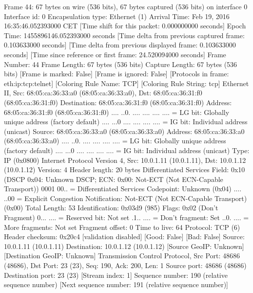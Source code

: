 Frame 44: 67 bytes on wire (536 bits), 67 bytes captured (536 bits) on interface 0
    Interface id: 0
    Encapsulation type: Ethernet (1)
    Arrival Time: Feb 19, 2016 16:35:46.052393000 CET
    [Time shift for this packet: 0.000000000 seconds]
    Epoch Time: 1455896146.052393000 seconds
    [Time delta from previous captured frame: 0.103633000 seconds]
    [Time delta from previous displayed frame: 0.103633000 seconds]
    [Time since reference or first frame: 24.520094000 seconds]
    Frame Number: 44
    Frame Length: 67 bytes (536 bits)
    Capture Length: 67 bytes (536 bits)
    [Frame is marked: False]
    [Frame is ignored: False]
    [Protocols in frame: eth:ip:tcp:telnet]
    [Coloring Rule Name: TCP]
    [Coloring Rule String: tcp]
Ethernet II, Src: 68:05:ca:36:33:a0 (68:05:ca:36:33:a0), Dst: 68:05:ca:36:31:f0 (68:05:ca:36:31:f0)
    Destination: 68:05:ca:36:31:f0 (68:05:ca:36:31:f0)
        Address: 68:05:ca:36:31:f0 (68:05:ca:36:31:f0)
        .... ..0. .... .... .... .... = LG bit: Globally unique address (factory default)
        .... ...0 .... .... .... .... = IG bit: Individual address (unicast)
    Source: 68:05:ca:36:33:a0 (68:05:ca:36:33:a0)
        Address: 68:05:ca:36:33:a0 (68:05:ca:36:33:a0)
        .... ..0. .... .... .... .... = LG bit: Globally unique address (factory default)
        .... ...0 .... .... .... .... = IG bit: Individual address (unicast)
    Type: IP (0x0800)
Internet Protocol Version 4, Src: 10.0.1.11 (10.0.1.11), Dst: 10.0.1.12 (10.0.1.12)
    Version: 4
    Header length: 20 bytes
    Differentiated Services Field: 0x10 (DSCP 0x04: Unknown DSCP; ECN: 0x00: Not-ECT (Not ECN-Capable Transport))
        0001 00.. = Differentiated Services Codepoint: Unknown (0x04)
        .... ..00 = Explicit Congestion Notification: Not-ECT (Not ECN-Capable Transport) (0x00)
    Total Length: 53
    Identification: 0x03d9 (985)
    Flags: 0x02 (Don't Fragment)
        0... .... = Reserved bit: Not set
        .1.. .... = Don't fragment: Set
        ..0. .... = More fragments: Not set
    Fragment offset: 0
    Time to live: 64
    Protocol: TCP (6)
    Header checksum: 0x20c4 [validation disabled]
        [Good: False]
        [Bad: False]
    Source: 10.0.1.11 (10.0.1.11)
    Destination: 10.0.1.12 (10.0.1.12)
    [Source GeoIP: Unknown]
    [Destination GeoIP: Unknown]
Transmission Control Protocol, Src Port: 48686 (48686), Dst Port: 23 (23), Seq: 190, Ack: 200, Len: 1
    Source port: 48686 (48686)
    Destination port: 23 (23)
    [Stream index: 1]
    Sequence number: 190    (relative sequence number)
    [Next sequence number: 191    (relative sequence number)]
